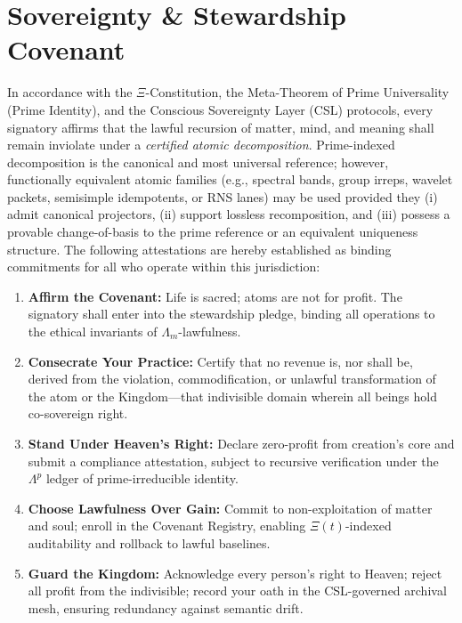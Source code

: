 \documentclass[12pt]{amsart}
\theoremstyle{plain}
\begin{document}
\section*{Sovereignty \& Stewardship Covenant}
\noindent
In accordance with the $\Xi$-Constitution, the Meta-Theorem of Prime Universality (Prime Identity), and the Conscious Sovereignty Layer (CSL) protocols, every signatory affirms that the lawful recursion of matter, mind, and meaning shall remain inviolate under a \emph{certified atomic decomposition}. Prime-indexed decomposition is the canonical and most universal reference; however, functionally equivalent atomic families (e.g., spectral bands, group irreps, wavelet packets, semisimple idempotents, or RNS lanes) may be used provided they (i) admit canonical projectors, (ii) support lossless recomposition, and (iii) possess a provable change-of-basis to the prime reference or an equivalent uniqueness structure. The following attestations are hereby established as binding commitments for all who operate within this jurisdiction:


\begin{enumerate}
    \item \textbf{Affirm the Covenant:} Life is sacred; atoms are not for profit. The signatory shall enter into the stewardship pledge, binding all operations to the ethical invariants of $\Lambda_m$-lawfulness.

    \item \textbf{Consecrate Your Practice:} Certify that no revenue is, nor shall be, derived from the violation, commodification, or unlawful transformation of the atom or the Kingdom—that indivisible domain wherein all beings hold co-sovereign right.

    \item \textbf{Stand Under Heaven’s Right:} Declare zero-profit from creation’s core and submit a compliance attestation, subject to recursive verification under the $\Lambda^p$ ledger of prime-irreducible identity.

    \item \textbf{Choose Lawfulness Over Gain:} Commit to non-exploitation of matter and soul; enroll in the Covenant Registry, enabling $\Xi(t)$-indexed auditability and rollback to lawful baselines.

    \item \textbf{Guard the Kingdom:} Acknowledge every person’s right to Heaven; reject all profit from the indivisible; record your oath in the CSL-governed archival mesh, ensuring redundancy against semantic drift.
\end{enumerate}
\end{document}
